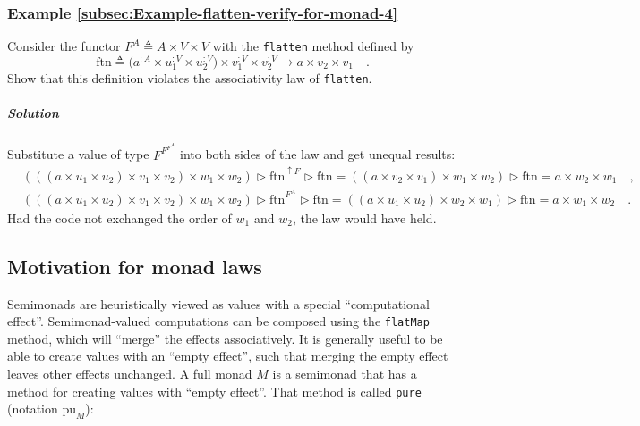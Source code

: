 \subsubsection{Example \label{subsec:Example-flatten-verify-for-monad-4}\ref{subsec:Example-flatten-verify-for-monad-4}}

Consider the functor $F^{A}\triangleq A\times V\times V$ with the
\lstinline!flatten! method defined by
\[
\text{ftn}\triangleq\big(a^{:A}\times u_{1}^{:V}\times u_{2}^{:V}\big)\times v_{1}^{:V}\times v_{2}^{:V}\rightarrow a\times v_{2}\times v_{1}\quad.
\]
Show that this definition violates the associativity law of \lstinline!flatten!.

\subparagraph{Solution}

Substitute a value of type $F^{F^{F^{A}}}$ into both sides of the
law and get unequal results:
\begin{align*}
 & \left(\left(\left(a\times u_{1}\times u_{2}\right)\times v_{1}\times v_{2}\right)\times w_{1}\times w_{2}\right)\triangleright\text{ftn}^{\uparrow F}\triangleright\text{ftn}=\left(\left(a\times v_{2}\times v_{1}\right)\times w_{1}\times w_{2}\right)\triangleright\text{ftn}=a\times w_{2}\times w_{1}\quad,\\
 & \left(\left(\left(a\times u_{1}\times u_{2}\right)\times v_{1}\times v_{2}\right)\times w_{1}\times w_{2}\right)\triangleright\text{ftn}^{F^{A}}\triangleright\text{ftn}=\left(\left(a\times u_{1}\times u_{2}\right)\times w_{2}\times w_{1}\right)\triangleright\text{ftn}=a\times w_{1}\times w_{2}\quad.
\end{align*}
Had the code not exchanged the order of $w_{1}$ and $w_{2}$, the
law would have held.

\subsection{Motivation for monad laws}

Semimonads are heuristically viewed as values with a special \textsf{``}computational
effect\textsf{''}. Semimonad-valued computations can be composed using the
\lstinline!flatMap! method, which will \textsf{``}merge\textsf{''} the effects associatively.
It is generally useful to be able to create values with an \textsf{``}empty
effect\textsf{''}, such that merging the empty effect leaves other effects
unchanged. A full monad $M$ is a semimonad that has a method for
creating values with \textsf{``}empty effect\textsf{''}. That method is called \lstinline!pure!
(notation $\text{pu}_{M}$):

